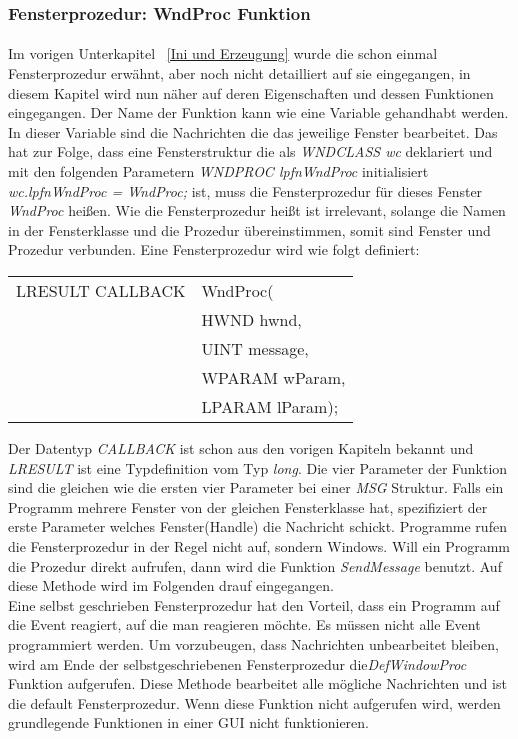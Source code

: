 \subsubsection{Fensterprozedur: WndProc Funktion}
\paragraph{}

Im vorigen Unterkapitel ~\ref{Ini und Erzeugung} wurde die schon einmal Fensterprozedur erwähnt, aber noch nicht detailliert auf sie eingegangen, in diesem Kapitel wird nun näher auf deren Eigenschaften und dessen Funktionen eingegangen. Der Name der Funktion kann wie eine Variable gehandhabt werden. In dieser Variable sind die Nachrichten die das jeweilige Fenster bearbeitet. Das hat zur Folge, dass eine Fensterstruktur die als \textit{WNDCLASS wc} deklariert und mit den folgenden Parametern \textit{WNDPROC lpfnWndProc} initialisiert \textit{wc.lpfnWndProc = WndProc;} ist, muss die Fensterprozedur für dieses Fenster \textit{WndProc} heißen. Wie die Fensterprozedur heißt ist irrelevant, solange die Namen in der Fensterklasse und die Prozedur übereinstimmen, somit sind Fenster und Prozedur verbunden. Eine Fensterprozedur wird wie folgt definiert:

\begin{tabular}{ll}
LRESULT CALLBACK & WndProc(\\
& HWND hwnd,\\
& UINT message,\\
& WPARAM wParam,\\
& LPARAM lParam);
\end{tabular}

Der Datentyp \textit{CALLBACK} ist schon aus den vorigen Kapiteln bekannt und \textit{LRESULT} ist eine Typdefinition vom Typ \textit{long}. Die vier Parameter der Funktion sind die gleichen wie die ersten vier Parameter bei einer \textit{MSG} Struktur. Falls ein Programm mehrere Fenster von der gleichen Fensterklasse hat, spezifiziert der erste Parameter welches Fenster(Handle) die Nachricht schickt. Programme rufen die Fensterprozedur in der Regel nicht auf, sondern Windows. Will ein Programm die Prozedur direkt aufrufen, dann wird die Funktion \textit{SendMessage} benutzt. Auf diese Methode wird im Folgenden drauf eingegangen.
\\

Eine selbst geschrieben Fensterprozedur hat den Vorteil, dass ein Programm auf die Event reagiert, auf die man reagieren möchte. Es müssen nicht alle Event programmiert werden. Um vorzubeugen, dass Nachrichten unbearbeitet bleiben, wird am Ende der selbstgeschriebenen Fensterprozedur die\textit{DefWindowProc} Funktion aufgerufen. Diese Methode bearbeitet alle mögliche Nachrichten und ist die default Fensterprozedur. Wenn diese Funktion nicht aufgerufen wird, werden grundlegende Funktionen in einer GUI nicht funktionieren.
\\

